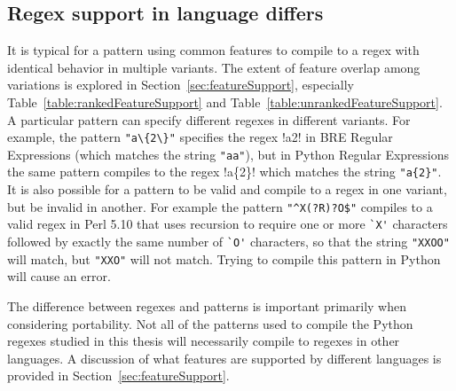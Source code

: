 \subsection{Regex support in language differs}
\label{sec:usuallyOk}
It is typical for a pattern using common features to compile to a regex with identical behavior in multiple variants.  The extent of feature overlap among variations is explored in Section~\ref{sec:featureSupport}, especially Table~\ref{table:rankedFeatureSupport} and Table~\ref{table:unrankedFeatureSupport}.  \label{sec:patternsAreNotRegexes} A particular pattern can specify different regexes in different variants.  For example, the pattern \verb!"a\{2\}"! specifies the regex \cverb!a{2}! in BRE Regular Expressions (which matches the string \verb!"aa"!), but in Python Regular Expressions the same pattern compiles to the regex \cverb!a\{2\}! which matches the string \verb!"a{2}"!.
It is also possible for a pattern to be valid and compile to a regex in one variant, but be invalid in another.  For example the pattern \verb!"^X(?R)?O$"! compiles to a valid regex in Perl 5.10 that uses recursion to require one or more \verb!`X'! characters followed by exactly the same number of \verb!`O'! characters, so that the string \verb!"XXOO"! will match, but \verb!"XXO"! will not match.  Trying to compile this pattern in Python will cause an error.

The difference between regexes and patterns is important primarily when considering portability.  Not all of the patterns used to compile the Python regexes studied in this thesis will necessarily compile to regexes in other languages.  A discussion of what features are supported by different languages is provided in Section~\ref{sec:featureSupport}.

